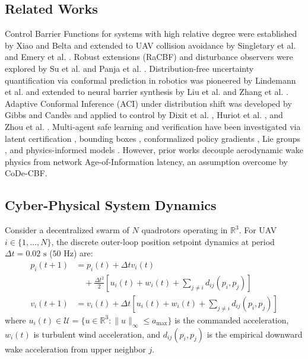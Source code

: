 \documentclass[lettersize,journal]{IEEEtran}
\begin{document}
\subsection{Related Works}
Control Barrier Functions for systems with high relative degree were established by Xiao and Belta \cite{xiao2021control} and extended to UAV collision avoidance by Singletary et al. \cite{singletary2024control} and Emery et al. \cite{emery2024collision}. Robust extensions (RaCBF) and disturbance observers were explored by Su et al. \cite{su2022downwash} and Panja et al. \cite{panja2024control}. Distribution-free uncertainty quantification via conformal prediction in robotics was pioneered by Lindemann et al. \cite{lindemann2023safe, lindemann2025formal} and extended to neural barrier synthesis by Liu et al. \cite{liu2025cp} and Zhang et al. \cite{zhang2025cped}. Adaptive Conformal Inference (ACI) under distribution shift was developed by Gibbs and Cand{\`e}s \cite{gibbs2021adaptive, gibbs2022conformal, angelopoulos2023gentle} and applied to control by Dixit et al. \cite{dixit2024safety}, Huriot et al. \cite{huriot2025safe}, and Zhou et al. \cite{zhou2025computationally}. Multi-agent safe learning and verification have been investigated via latent certification \cite{anand2025safety}, bounding boxes \cite{timans2024adaptive}, conformalized policy gradients \cite{zhang2026conformalized}, Lie groups \cite{marques2026lies}, and physics-informed models \cite{drgona2025safe}. However, prior works decouple aerodynamic wake physics from network Age-of-Information latency, an assumption overcome by CoDe-CBF.

\subsection{Cyber-Physical System Dynamics}
Consider a decentralized swarm of $N$ quadrotors operating in $\mathbb{R}^3$. For UAV $i \in \{1, \dots, N\}$, the discrete outer-loop position setpoint dynamics at period $\Delta t = 0.02\text{ s}$ ($50\text{ Hz}$) are:
\begin{align}
p_i(t+1) &= p_i(t) + \Delta t v_i(t) \nonumber \\
&\quad + \frac{\Delta t^2}{2} \left[ u_i(t) + w_i(t) + \sum_{j \neq i} d_{ij}(p_i, p_j) \right] \nonumber \\
v_i(t+1) &= v_i(t) + \Delta t \left[ u_i(t) + w_i(t) + \sum_{j \neq i} d_{ij}(p_i, p_j) \right]
\end{align}
where $u_i(t) \in \mathcal{U} = \{u \in \mathbb{R}^3 : \|u\|_\infty \le a_{\max}\}$ is the commanded acceleration, $w_i(t)$ is turbulent wind acceleration, and $d_{ij}(p_i, p_j)$ is the empirical downward wake acceleration from upper neighbor $j$.
\end{document}
